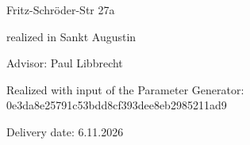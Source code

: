 \begin{large} 
\begin{center}
Fritz-Schröder-Str 27a
\end{center}
\end{large} 

\vspace*{-6mm}

\begin{large} 
\begin{center}
realized in Sankt Augustin
\end{center}
\end{large} 

\vspace*{5mm}

\begin{large} 
\begin{center}
Advisor: Paul Libbrecht
\end{center}
\end{large} 

\begin{large} 
\begin{center}
Realized with input of the Parameter Generator: 0e3da8e25791c53bdd8cf393dee8eb2985211ad9
\end{center}
\end{large} 



\vspace*{-6mm}

\begin{large} 
\begin{center}
Delivery date: 6.11.2026
\end{center}
\end{large} 


\pagestyle{empty} %

